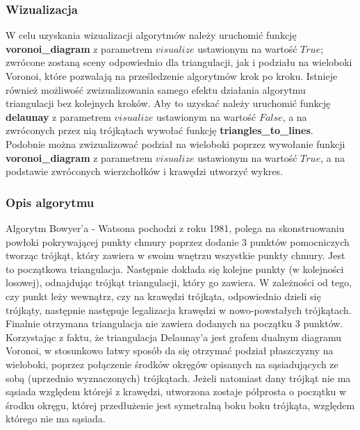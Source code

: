 \documentclass{article}
\begin{document}
\subsubsection{Wizualizacja}
W celu uzyskania wizualizacji algorytmów należy uruchomić funkcję \textbf{voronoi\_diagram} z parametrem $visualize$ ustawionym na wartość $True$; zwrócone zostaną sceny odpowiednio dla triangulacji, jak i podziału na wieloboki Voronoi, które pozwalają na prześledzenie algorytmów krok po kroku. 
\newline 
\newline 
Istnieje również możliwość zwizualizowania samego efektu działania algorytmu triangulacji bez kolejnych kroków. Aby to uzyskać należy uruchomić funkcję \textbf{delaunay} z parametrem $visualize$ ustawionym na wartość $False$, a na zwróconych przez nią trójkątach wywołać funkcję \textbf{triangles\_to\_lines}.
\newline 
\newline
Podobnie można zwizualizować podział na wieloboki poprzez wywołanie funkcji \textbf{voronoi\_diagram} z parametrem $visualize$ ustawionym na wartość $True$, a na podstawie zwróconych wierzchołków i krawędzi utworzyć wykres. 

\subsubsection{Opis algorytmu}
Algorytm Bowyer'a - Watsona pochodzi z roku 1981, polega na skonstruowaniu powłoki pokrywającej punkty chmury poprzez dodanie 3 punktów pomocniczych tworząc trójkąt, który zawiera w swoim wnętrzu wszystkie punkty chmury. Jest to początkowa triangulacja. Następnie dokłada się kolejne punkty (w kolejności losowej), odnajdując trójkąt triangulacji, który go zawiera. W zależności od tego, czy punkt leży wewnątrz, czy na krawędzi trójkąta, odpowiednio dzieli się trójkąty, następnie następuje legalizacja krawędzi w nowo-powstałych trójkątach. Finalnie otrzymana triangulacja nie zawiera dodanych na początku 3 punktów. 
\newline
Korzystając z faktu, że triangulacja Delaunay'a jest grafem dualnym diagramu Voronoi, w stosunkowo łatwy sposób da się otrzymać podział płaszczyzny na wieloboki, poprzez połączenie środków okręgów opisanych na sąsiadujących ze sobą (uprzednio wyznaczonych) trójkątach. Jeżeli natomiast dany trójkąt nie ma sąsiada względem którejś z krawędzi, utworzona zostaje półprosta  o początku w środku okręgu, której przedłużenie jest symetralną boku boku trójkąta, względem którego nie ma sąsiada.
\end{document}
